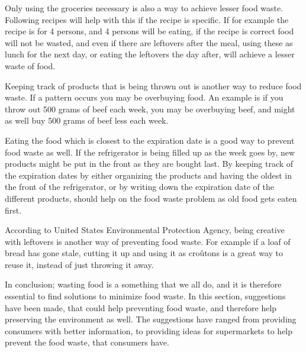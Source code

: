 Only using the groceries necessary is also a way to achieve lesser food waste. Following recipes will help with this if the recipe is specific. If for example the recipe is for 4 persons, and 4 persons will be eating, if the recipe is correct food will not be wasted, and even if there are leftovers after the meal, using these as lunch for the next day, or eating the leftovers the day after, will achieve a lesser waste of food\cite{madSpild_MindreMadspild}.

Keeping track of products that is being thrown out is another way to reduce food waste. If a pattern occurs you may be overbuying food. An example is if you throw out 500 grams of beef each week, you may be overbuying beef, and might as well buy 500 grams of beef less each week\cite{madSpild_Greatist}.

Eating the food which is closest to the expiration date is a good way to prevent food waste as well. If the refrigerator is being filled up as the week goes by, new products might be put in the front as they are bought last. By keeping track of the expiration dates by either organizing the products and having the oldest in the front of the refrigerator, or by writing down the expiration date of the different products, should help on the food waste problem as old food gets eaten first.

According to United States Environmental Protection Agency\cite{madSpild_EPA}, being creative with leftovers is another way of preventing food waste. For example if a loaf of bread has gone stale, cutting it up and using it as croûtons is a great way to reuse it, instead of just throwing it away.

In conclusion; wasting food is a something that we all do, and it is therefore essential to find solutions to minimize food waste. In this section, suggestions have been made, that could help preventing food waste, and therefore help preserving the environment as well. The suggestions have ranged from providing consumers with better information, to providing ideas for supermarkets to help prevent the food waste, that consumers have.